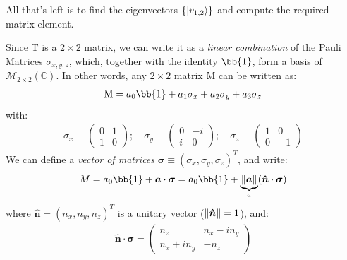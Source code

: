 \documentclass[12pt,a4paper]{report}
\begin{document}
\begin{enumerate}
        All that's left is to find the eigenvectors $\{\ket{v_{1,2}}\}$ and compute the required matrix element. 

        \medskip

        Since $\mathrm{T}$ is a $2\times 2$ matrix, we can write it as a \textit{linear combination} of the Pauli Matrices $\sigma_{x,y,z}$, which, together with the identity $\bb{1}$, form a basis of $\mathcal{M}_{2 \times 2}(\mathbb{C})$. In other words, any $2\times 2$ matrix $\mathrm{M}$ can be written as:
        \begin{align*}
            \mathrm{M} = a_0 \bb{1} + a_1 \sigma_x + a_2 \sigma_y + a_3 \sigma_z
        \end{align*}
        with:
        \begin{align*}
            \sigma_x \equiv \left(\begin{array}{cc}
            0 & 1 \\ 
            1 & 0
            \end{array}\right); \quad \sigma_y \equiv \left(\begin{array}{cc}
            0 & -i \\ 
            i & 0
            \end{array}\right); \quad \sigma_z \equiv \left(\begin{array}{cc}
            1 & 0 \\ 
            0 & -1
            \end{array}\right)
        \end{align*}
        We can define a \textit{vector of matrices} $\bm{\sigma}\equiv (\sigma_x, \sigma_y, \sigma_z)^T$, and write:
        \begin{align*}
            M = a_0 \bb{1} + \bm{a} \cdot \bm{\sigma} = a_0 \bb{1} + \underbrace{\norm{\bm{a}}}_{a} (\bm{\hat{n}} \cdot \bm{\sigma}) 
        \end{align*}
        where $\bm{\hat{n}} = (n_x, n_y, n_z)^T$ is a unitary vector ($\norm{\bm{\hat{n}}} = 1$), and:
        \begin{align*}
            \bm{\hat{n}}\cdot \bm{\sigma} = \left(\begin{array}{cc}
            n_z & n_x - i n_y \\ 
            n_x + in_y & -n_z
            \end{array}\right)
        \end{align*}


\end{enumerate}
\end{document}
